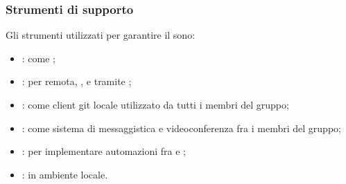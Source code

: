     \subsubsection{Strumenti di supporto}
    Gli strumenti utilizzati per garantire il  sono:
    \begin{itemize}
        \item \textbf{}: come ;
        \item \textbf{}: per  remota, ,  e  tramite ;
        \item \textbf{}: come client git locale utilizzato da tutti i membri del gruppo;
        \item \textbf{}: come sistema di messaggistica e videoconferenza fra i membri del gruppo;
        \item \textbf{}: per implementare automazioni fra  e ;
        \item \textbf{}:  in ambiente locale.
    \end{itemize}


